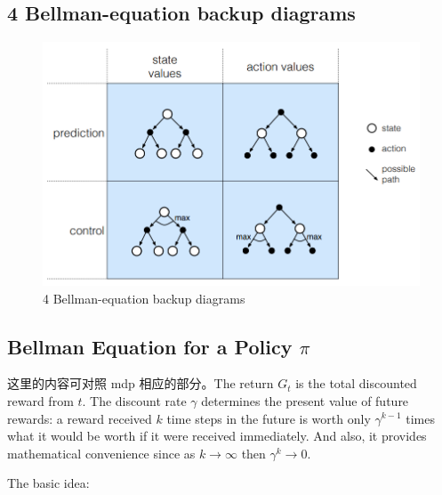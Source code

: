 \subsection{4 Bellman-equation backup diagrams}

\begin{figure}[!htb]
\centering
\includegraphics[scale=0.7]{pix/4-backup-diagrams.png}
\caption{4 Bellman-equation backup diagrams}
\end{figure}


\subsection{Bellman Equation for a Policy $\pi$}

这里的内容可对照 mdp 相应的部分。The return $G_t$ is the total discounted reward from $t$.
The discount rate $\gamma$ determines the present value of future rewards: a 
reward received $k$ time steps in the future is worth only $\gamma^{k-1}$ times 
what it would be worth if it were received immediately. And also, it provides 
mathematical convenience since as $k\rightarrow\infty$ then $\gamma^k\rightarrow 0$.

The basic idea:

